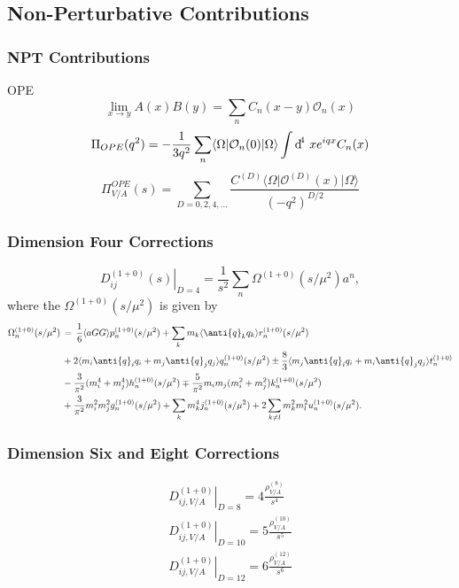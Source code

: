 \documentclass[fleqn]{beamer}
\begin{document}
\subsection{Non-Perturbative Contributions}
\begin{frame}
  \frametitle{NPT Contributions}
  OPE
  \begin{equation}
    \lim_{x\to y} A(x) B(y) = \sum_n C_n(x-y) \mathcal{O}_n(x)
  \end{equation}
  \begin{equation}
    \Pi_{OPE}(q^2) = - \frac{1}{3 q^2} \sum_n \langle \Omega \vert \mathcal{O}_n(0) \vert \Omega \rangle \int \dif^4 \, x e^{iqx} C_n(x)
  \end{equation}
  \begin{equation}
    \Pi_{V/A}^{OPE}(s) = \sum_{D=0,2,4,\dots} \frac{C^{(D)}\langle \Omega \vert \mathcal{O}^{(D)} (x) \vert \Omega \rangle}{(-q^2)^{D/2}}
  \end{equation}
\end{frame}
\begin{frame}
  \frametitle{Dimension Four Corrections}
  \begin{equation}
    \left. D_{ij}^{(1+0)}(s) \right\rvert_{D=4} = \frac{1}{s^2} \sum_n \Omega^{(1+0)}(s/\mu^2)a^n,
  \end{equation}
  where the \(\Omega^{(1+0)}(s/\mu^2)\) is given by
  \begin{equation}
    \begin{split}
      \Omega_n^{(1+0)} (s/\mu^2) &\,=\, \frac{1}{6}\langle aGG \rangle p_n^{(1+0)}(s/\mu^2) + \sum_k m_k \langle \anti{q}_k q_k \rangle r_n^{(1+0)}(s/\mu^2) \\
      &\,+ 2\langle m_i \anti{q}_i q_i + m_j \anti{q}_j q_j \rangle q_n^{(1+0)} (s/\mu^2) \pm \frac{8}{3} \langle m_j \anti{q}_i q_i + m_i \anti{q}_j q_j \rangle t_n^{(1+0)} \\
      &\,- \frac{3}{\pi^2} (m_i^4 + m_j^4) h_n^{(1+0)} (s/\mu^2) \mp \frac{5}{\pi^2} m_i m_j (m_i^2 + m_j^2) k_n^{(1+0)}(s/\mu^2)\\
      &\,+ \frac{3}{\pi^2} m_i^2 m_j^2 g_n^{(1+0)}(s/\mu^2) + \sum_k m_k^4
      j_n^{(1+0)}(s/\mu^2) + 2 \sum_{k \neq l} m_k^2 m_l^2 u_n^{(1+0)}(s/\mu^2).
    \end{split}
  \end{equation}
\end{frame}
\begin{frame}
  \frametitle{Dimension Six  and Eight Corrections}
  \begin{equation}
    \begin{split}
      \left. D_{ij,V/A}^{(1+0)} \right\rvert_{D=8} = 4 \frac{\rho_{V/A}^{(8)}}{s^4} \\
      \left. D_{ij,V/A}^{(1+0)} \right\rvert_{D=10} = 5 \frac{\rho_{V/A}^{(10)}}{s^5} \\
      \left. D_{ij,V/A}^{(1+0)} \right\rvert_{D=12} = 6 \frac{\rho_{V/A}^{(12)}}{s^6}
    \end{split} 
  \end{equation}
\end{frame}
\end{document}
